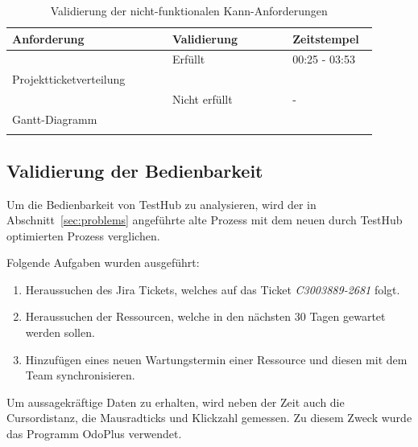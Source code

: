 \begin{longtable}{| P{0.4\linewidth} | P{0.3\linewidth} | P{0.2\linewidth} |} 
  \hline
  \textbf{Anforderung} & \textbf{Validierung} & \textbf{Zeitstempel}\\ [0.5ex] 
  \hline
  
   & Erfüllt & 00:25 - 03:53 \\
  Projektticketverteilung &  & \\ [0.5ex] \hline

   & Nicht erfüllt & - \\
  Gantt-Diagramm &  & \\ [0.5ex] \hline

  \caption{Validierung der nicht-funktionalen Kann-Anforderungen}\label{tab:kannvalidierungnfa}
\end{longtable}

\subsection{Validierung der Bedienbarkeit}
Um die Bedienbarkeit von TestHub zu analysieren, wird der in Abschnitt~\ref{sec:problems}
angeführte alte Prozess mit dem neuen durch TestHub optimierten Prozess verglichen.

Folgende Aufgaben wurden ausgeführt:

\begin{enumerate}
    \item Heraussuchen des \gls{Jira} Tickets, welches auf das Ticket \textit{C3003889-2681} folgt.
    \item Heraussuchen der Ressourcen, welche in den nächsten 30 Tagen gewartet werden sollen.
    \item Hinzufügen eines neuen Wartungstermin einer Ressource und diesen mit dem Team synchronisieren.
\end{enumerate}

Um aussagekräftige Daten zu erhalten, wird neben der Zeit auch die Cursordistanz,
die Mausradticks und Klickzahl gemessen. Zu diesem Zweck wurde das Programm OdoPlus
verwendet.

